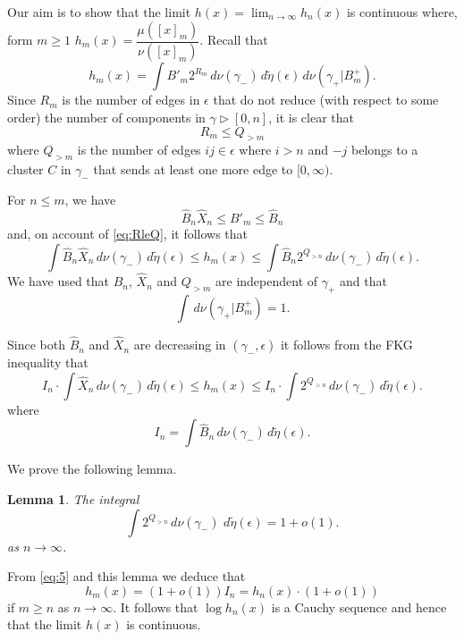 \documentclass[11pt, a4paper, oneside]{scrartcl}
\newtheorem{lemma}[thm]{Lemma}
\theoremstyle{definition}
\theoremstyle{remark}
\renewcommand{\d}{\,d}
\providecommand{\ordo}[1]{{o(#1)}}
\providecommand{\e}{\epsilon}
\providecommand{\tl}{\tilde}
\providecommand{\g}{\gamma}
\begin{document}
Our aim is to show that the limit $h(x)=\lim_{n\to\infty} h_n(x)$ is continuous where, form $m\ge1$
\(h_m(x) = \dfrac{\mu([x]_m)}{\nu([x]_m)}\).
Recall that
\begin{equation}\label{eq:3}
  h_m(x) =  \int B'_m 2^{R_m} \d \nu(\g_-)\d\tl\eta(\e) \d \nu(\g_+|B_m^+).
\end{equation}
Since $R_m$ is the number of edges in $\e$ that do not reduce (with respect to
some order) the number of components in $\g\triangleright [0,n]$, it is clear
that
\begin{equation}\label{eq:RleQ}
  R_m \le Q_{>m}
\end{equation}
where \(Q_{>m}\) is the number of edges $ij\in\e$ where $i>n$ and $-j$ belongs
to a cluster $C$ in $\g_-$ that sends at least one more edge to $[0,\infty)$.

For $n\le m$, we have
$$ \hat B_n \hat X_n \le B'_m \le \hat B_n $$
and, on account of \eqref{eq:RleQ}, it follows that
\begin{equation}\label{eq:4}
  \int \hat B_n \hat X_n \d \nu(\g_-) \d\tl\eta(\e)
  \le h_m(x) \le \int \hat B_n 2^{Q_{>n}} \d\nu(\g_-) \d\tl\eta(\e).
\end{equation}
We have used that $\hat B_n$, $\hat X_n$ and $Q_{>m}$ are independent of $\g_+$ and that
$$\int\d\nu(\g_+|B_m^+)=1. $$

Since both $\hat B_n$ and $\hat X_n$ are decreasing in $(\g_-,\e)$ it follows
from the FKG inequality that
\begin{equation}
  \label{eq:5}
  I_n \cdot \int \hat X_n \d\nu(\g_-) \d\tl\eta(\e)
  \le h_m(x)
  \le I_n \cdot \int 2^{Q_{>n}} \d\nu(\g_-) \d\tl\eta(\e).
\end{equation}
where
\begin{equation}
  \label{eq:6}
  I_n = \int \hat B_n \d\nu(\g_-) \d\tl\eta(\e).
\end{equation}

We prove the following lemma.
\begin{lemma}\label{lem:qn}
  The integral
  \[
    \int 2^{Q_{>n}} \d\nu(\g_-)\, \d\tilde\eta(\e) = 1+\ordo{1}.
  \]
  as $n\to\infty$.
\end{lemma}

From \eqref{eq:5} and this lemma we deduce that
\begin{equation}
  \label{eq:2}
  h_m(x) = (1+\ordo1) I_n = h_n(x) \cdot (1+\ordo1)
\end{equation}
if $m\ge n$ as $n\to\infty$. It follows that $\log h_n(x)$ is a Cauchy sequence
and hence that the limit $h(x)$ is continuous.
\end{document}
